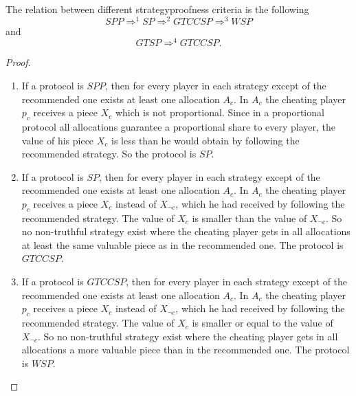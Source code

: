 \begin{lem}
\label{thm5} The relation between different strategyproofness criteria is the following $$SPP \Rightarrow^{1} SP \Rightarrow^{2} GTCCSP \Rightarrow^{3} WSP$$ and
$$GTSP \Rightarrow^{4} GTCCSP.$$
\end{lem}
\begin{proof}
\textcolor{white}{x}
\begin{enumerate}
\item If a protocol is $SPP$, then for every player in each strategy except of the recommended one exists at least one allocation $A_c$. In $A_c$ the cheating player $p_c$ receives a piece $X_c$ which is not proportional. Since in a proportional protocol all allocations guarantee a proportional share to every player, the value of his piece $X_c$ is less than he would obtain by following the recommended strategy. So the protocol is $SP$.   
\item If a protocol is $SP$, then for every player in each strategy except of the recommended one exists at least one allocation $A_c$. In $A_c$ the cheating player $p_c$ receives a piece $X_{c}$ instead of $X_{\neg c}$, which he had received by following the recommended strategy. The value of $X_c$ is smaller than the value of $X_{\neg c}$. So no non-truthful strategy exist where the cheating player gets in all allocations at least the same valuable piece as in the recommended one. The protocol is $GTCCSP$.
\item If a protocol is $GTCCSP$, then for every player in each strategy except of the recommended one exists at least one allocation $A_c$. In $A_c$ the cheating player $p_c$ receives a piece $X_{c}$ instead of $X_{\neg c}$, which he had received by following the recommended strategy. The value of $X_c$ is smaller or equal to the value of $X_{\neg c}$. So no non-truthful strategy exist where the cheating player gets in all allocations a more valuable piece than in the recommended one. The protocol is $WSP$.

\end{enumerate}
\end{proof}
